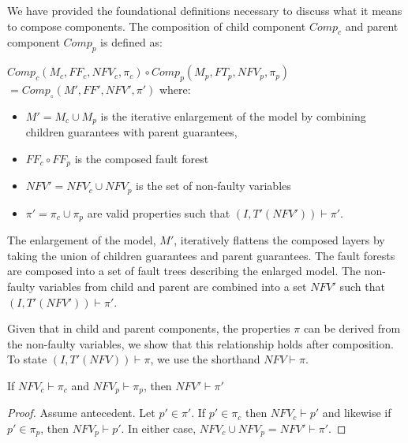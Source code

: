 We have provided the foundational definitions necessary to discuss what it means to compose components. The composition of child component $\mathit{Comp}_c$ and parent component $\mathit{Comp}_p$ is defined as:

\begin{definition}
$Comp_c(M_c, \mathit{FF}_c, \mathit{NFV}_c, \pi_c) \circ Comp_p(M_p, \mathit{FT}_p, \mathit{NFV}_p, \pi_p) $\\$= Comp_\circ(M', \mathit{FF}', \mathit{NFV}', \pi')$ where:
\begin{itemize}[label=\textbullet]
\item $M' = M_c \cup M_p$ is the iterative enlargement of the model by combining children guarantees with parent guarantees,
\item $\mathit{FF}_c \circ \mathit{FF}_p$ is the composed fault forest
\item $\mathit{NFV}' = \mathit{NFV}_c \cup \mathit{NFV}_p$ is the set of non-faulty variables
\item $\pi' = \pi_c \cup \pi_p$ are valid properties such that $(I, T'(\mathit{NFV}')) \vdash \pi'$.
\end{itemize}
\end{definition}

The enlargement of the model, $M'$, iteratively flattens the composed layers by taking the union of children guarantees and parent guarantees. The fault forests are composed into a set of fault trees describing the enlarged model. The non-faulty variables from child and parent are combined into a set $\mathit{NFV'}$ such that $(I, T'(\mathit{NFV}')) \vdash \pi'$. 


Given that in child and parent components, the properties $\pi$ can be derived from the non-faulty variables, we show that this relationship holds after composition. To state $(I, T'(\mathit{NFV})) \vdash \pi$, we use the shorthand $\mathit{NFV} \vdash \pi$. 

\begin{theorem} If $\mathit{NFV}_c \vdash \pi_c$ and $\mathit{NFV}_p \vdash \pi_p$, then $\mathit{NFV}' \vdash \pi'$
\begin{proof}
Assume antecedent. Let $p' \in \pi'$. If $p' \in \pi_c$ then $\mathit{NFV}_c \vdash p'$ and likewise if $p' \in \pi_p$, then $\mathit{NFV}_p \vdash p'$. In either case, $\mathit{NFV}_c \cup \mathit{NFV}_p = \mathit{NFV}' \vdash \pi'$.
\end{proof}
\end{theorem} 

